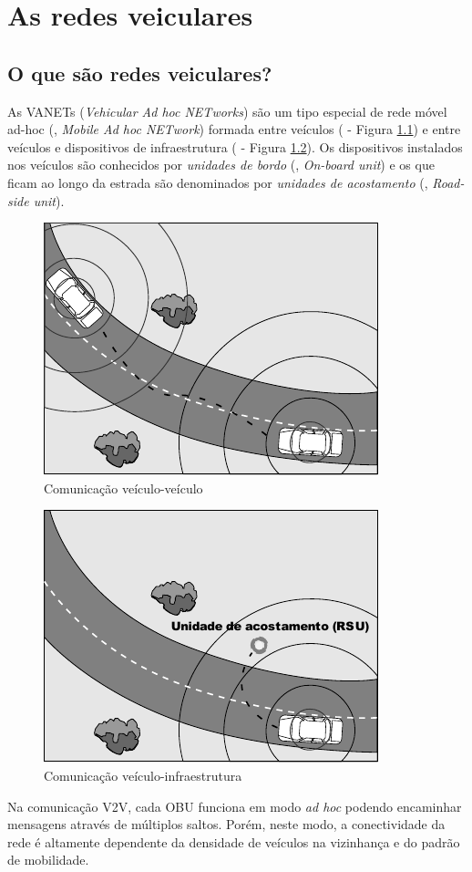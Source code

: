 \chapter{As redes veiculares}
\label{chapter:vanets}

\section{O que são redes veiculares?}
As VANETs (\textit{Vehicular Ad hoc NETworks}) são um tipo especial de rede
móvel ad-hoc (, \textit{Mobile Ad
hoc NETwork}) formada entre veículos ( -
Figura \ref{fig:v2v}) e entre veículos e dispositivos de infraestrutura
( - Figura \ref{fig:v2i}). Os
dispositivos instalados nos veículos são conhecidos por \textit{unidades de
bordo} (, \textit{On-board unit}) e os que
ficam ao longo da estrada são denominados por \textit{unidades de acostamento}
(, \textit{Road-side unit}).

\begin{figure}[htbp]
\centering
 \includegraphics[width=.35\textwidth]{chapters/fig/v2v.pdf}
\caption{Comunicação veículo-veículo}
\label{fig:v2v}
\end{figure}

\begin{figure}[htbp]
\centering
 \includegraphics[width=.35\textwidth]{chapters/fig/v2i.pdf}
\caption{Comunicação veículo-infraestrutura}
\label{fig:v2i}
\end{figure}

Na comunicação V2V, cada OBU funciona em modo \textit{ad hoc} podendo encaminhar
mensagens através de múltiplos saltos. Porém, neste modo, a conectividade da
rede é altamente dependente da densidade de veículos na vizinhança e do padrão
de mobilidade.

